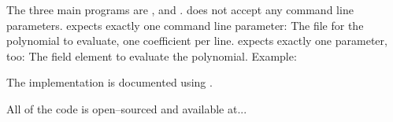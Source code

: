%
%
\label{sec:usage}

The three main programs are \JWBpOne{}, \JWBpTwo{} and \JWBtoken{}. \JWBtoken{}
does not accept any command line parameters. \JWpOne{} expects exactly one
command line parameter: The file for the polynomial to evaluate, one coefficient
per line. \JWpTwo{} expects exactly one parameter, too: The field element to
evaluate the polynomial. Example:





%
%
\label{sec:implementation-doc}

The implementation is documented using \JWTLhaddock{}.



%
%
\label{sec:code-availability}

All of the code is open--sourced and available at...


